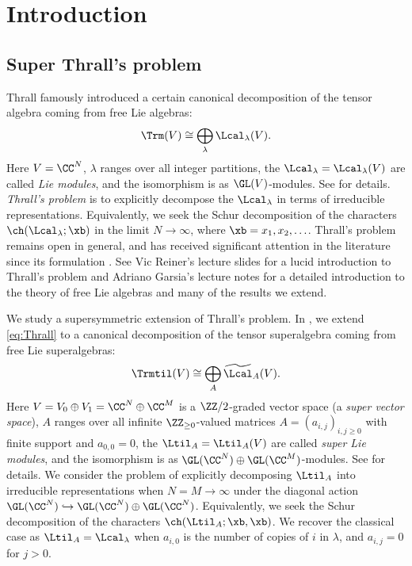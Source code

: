 \section{Introduction}
\subsection{Super Thrall's problem}
Thrall \cite{Thrall} famously introduced a certain canonical decomposition of the tensor algebra coming from free Lie algebras:
\begin{equation}\label{eq:Thrall}
    \Trm(V) \cong \bigoplus_\lambda \Lcal_\lambda(V).
\end{equation}
Here $V = \CC^N$, $\lambda$ ranges over all integer partitions, the $\Lcal_\lambda = \Lcal_\lambda(V)$ are called \textit{Lie modules}, and the isomorphism is as $\GL(V)$-modules. See  for details. \textit{Thrall's problem} is to explicitly decompose the $\Lcal_\lambda$ in terms of irreducible representations. Equivalently, we seek the Schur decomposition of the characters $\ch(\Lcal_\lambda; \xb)$ in the limit $N \to \infty$, where $\xb = x_1, x_2, \ldots$. Thrall's problem remains open in general, and has received significant attention in the literature since its formulation \cite{AS,BBG,Brandt,Gar,GR,Kly,KW,Sch,Sun}. See Vic Reiner's lecture slides \cite{Rei} for a lucid introduction to Thrall's problem and Adriano Garsia's lecture notes \cite{Gar} for a detailed introduction to the theory of free Lie algebras and many of the results we extend.

We study a supersymmetric extension of Thrall's problem. In , we extend \eqref{eq:Thrall} to a canonical decomposition of the tensor superalgebra coming from free Lie superalgebras:
\begin{equation}\label{eq:super-Thrall}
    \Trmtil(V) \cong \bigoplus_A \widetilde{\Lcal}_A(V).
\end{equation}
Here $V = V_0 \oplus V_1 = \CC^N \oplus \CC^M$ is a $\ZZ/2$-graded vector space (a \textit{super vector space}), $A$ ranges over all infinite $\ZZ_{\geq 0}$-valued matrices $A=(a_{i,j})_{i,j \geq 0}$ with finite support and $a_{0,0}=0$, the $\Ltil_A = \Ltil_A(V)$ are called \textit{super Lie modules}, and the isomorphism is as $\GL(\CC^N) \oplus \GL(\CC^M)$-modules. See  for details. We consider the problem of explicitly decomposing $\Ltil_A$ into irreducible representations when $N=M \to \infty$ under the diagonal action $\GL(\CC^N) \hookrightarrow \GL(\CC^N) \oplus \GL(\CC^N)$. Equivalently, we seek the Schur decomposition of the characters $\ch(\Ltil_A; \xb, \xb)$. We recover the classical case as $\Ltil_A = \Lcal_\lambda$ when $a_{i,0}$ is the number of copies of $i$ in $\lambda$, and $a_{i,j} = 0$ for $j > 0$.

